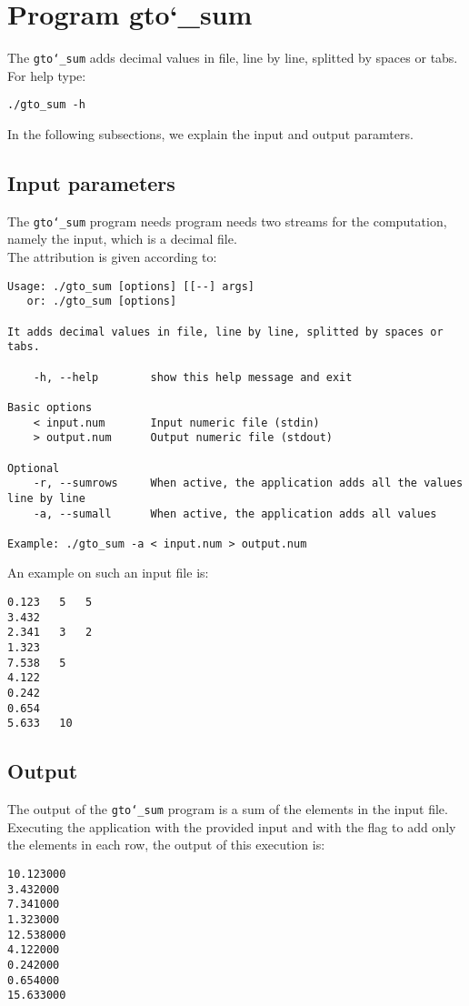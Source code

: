\section{Program gto\char`_sum}
The \texttt{gto\char`_sum} adds decimal values in file, line by line, splitted by spaces or tabs.\\
For help type:
\begin{lstlisting}
./gto_sum -h
\end{lstlisting}
In the following subsections, we explain the input and output paramters.

\subsection*{Input parameters}

The \texttt{gto\char`_sum} program needs program needs two streams for the computation, namely the input, which is a decimal file.\\
The attribution is given according to:
\begin{lstlisting}
Usage: ./gto_sum [options] [[--] args]
   or: ./gto_sum [options]

It adds decimal values in file, line by line, splitted by spaces or tabs.

    -h, --help        show this help message and exit

Basic options
    < input.num       Input numeric file (stdin)
    > output.num      Output numeric file (stdout)

Optional
    -r, --sumrows     When active, the application adds all the values line by line
    -a, --sumall      When active, the application adds all values

Example: ./gto_sum -a < input.num > output.num
\end{lstlisting}
An example on such an input file is:
\begin{lstlisting}
0.123	5	5
3.432
2.341   3   2
1.323
7.538	5
4.122
0.242 
0.654
5.633	10
\end{lstlisting}

\subsection*{Output}
The output of the \texttt{gto\char`_sum} program is a sum of the elements in the input file.\\
Executing the application with the provided input and with the flag to add only the elements in each row, the output of this execution is:
\begin{lstlisting}
10.123000
3.432000
7.341000
1.323000
12.538000
4.122000
0.242000
0.654000
15.633000
\end{lstlisting}